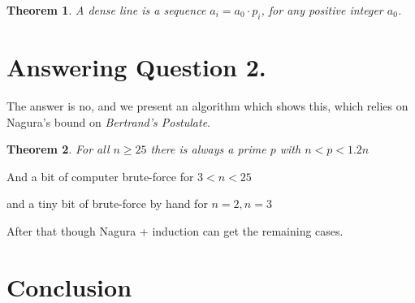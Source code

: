 \documentclass[a4paper, 12pt]{article}
\newtheorem{theorem}{Theorem}
\theoremstyle{definition}
\begin{document}
\begin{theorem}
  A dense line is a sequence $a_i = a_0 \cdot p_i$, for any positive integer $a_0$.
\end{theorem}

\section{Answering Question 2.}
The answer is no, and we present an algorithm which shows this, which relies on Nagura's bound on \textit{Bertrand's Postulate}.
\begin{theorem}
  For all $n\geq 25$ there is always a prime $p$ with $n < p < 1.2n$
\end{theorem}

And a bit of computer brute-force for $3 < n < 25$

and a tiny bit of brute-force by hand for $n=2, n=3$

After that though Nagura + induction can get the remaining cases.

\section{Conclusion}


\newpage

\printbibliography
\end{document}
